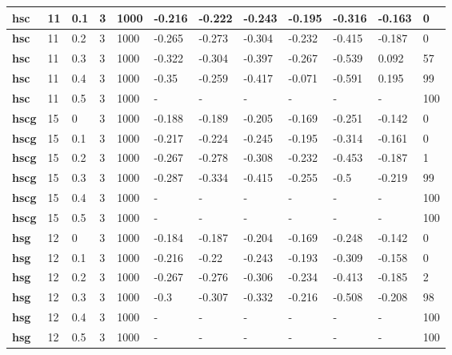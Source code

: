 \begin{longtable}[h]{|p{0.8cm}|p{1.5cm}|p{1cm}|p{1cm}|p{1cm}|p{1cm}|p{1cm}|p{1cm}|p{1cm}|p{1cm}|p{1cm}|p{1.5cm}|}
    \\ \hline
  \textbf{hsc } &  11         & 0.1 & 3 & 1000 & -0.216 & -0.222 & -0.243 & -0.195 & -0.316 & -0.163 &   0
    \\ \hline
  \textbf{hsc } &  11         & 0.2 & 3 & 1000 & -0.265 & -0.273 & -0.304 & -0.232 & -0.415 & -0.187 &   0
    \\ \hline
  \textbf{hsc } &  11         & 0.3 & 3 & 1000 & -0.322 & -0.304 & -0.397 & -0.267 & -0.539 &  0.092 &  57
    \\ \hline
  \textbf{hsc } &  11         & 0.4 & 3 & 1000 &  -0.35 & -0.259 & -0.417 & -0.071 & -0.591 &  0.195 &  99
    \\ \hline
  \textbf{hsc } &  11         & 0.5 & 3 & 1000 & - & - & - & - & - & - & 100
    \\ \hline
  \textbf{hscg} &  15         &   0 & 3 & 1000 & -0.188 & -0.189 & -0.205 & -0.169 & -0.251 & -0.142 &   0
    \\ \hline
  \textbf{hscg} &  15         & 0.1 & 3 & 1000 & -0.217 & -0.224 & -0.245 & -0.195 & -0.314 & -0.161 &   0
    \\ \hline
  \textbf{hscg} &  15         & 0.2 & 3 & 1000 & -0.267 & -0.278 & -0.308 & -0.232 & -0.453 & -0.187 &   1
    \\ \hline
  \textbf{hscg} &  15         & 0.3 & 3 & 1000 & -0.287 & -0.334 & -0.415 & -0.255 &   -0.5 & -0.219 &  99
    \\ \hline
  \textbf{hscg} &  15         & 0.4 & 3 & 1000 & - & - & - & - & - & - & 100
    \\ \hline
  \textbf{hscg} &  15         & 0.5 & 3 & 1000 & - & - & - & - & - & - & 100
    \\ \hline
  \textbf{hsg } &  12         &   0 & 3 & 1000 & -0.184 & -0.187 & -0.204 & -0.169 & -0.248 & -0.142 &   0
    \\ \hline
  \textbf{hsg } &  12         & 0.1 & 3 & 1000 & -0.216 &  -0.22 & -0.243 & -0.193 & -0.309 & -0.158 &   0
    \\ \hline
  \textbf{hsg } &  12         & 0.2 & 3 & 1000 & -0.267 & -0.276 & -0.306 & -0.234 & -0.413 & -0.185 &   2
    \\ \hline
  \textbf{hsg } &  12         & 0.3 & 3 & 1000 &   -0.3 & -0.307 & -0.332 & -0.216 & -0.508 & -0.208 &  98
    \\ \hline
  \textbf{hsg } &  12         & 0.4 & 3 & 1000 & - & - & - & - & - & - & 100
    \\ \hline
  \textbf{hsg } &  12         & 0.5 & 3 & 1000 & - & - & - & - & - & - & 100
    \\ \hline
 \end{longtable}
